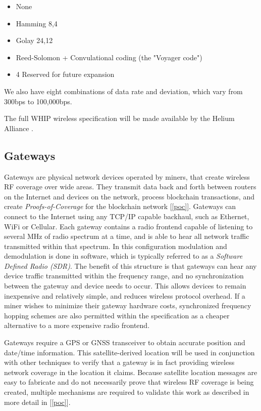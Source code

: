 \documentclass[letterpaper,11pt]{article}
\begin{document}
\begin{itemize}
	\item None
	\item Hamming 8,4
	\item Golay 24,12
	\item Reed-Solomon + Convulational coding (the "Voyager code")
	\item 4 Reserved for future expansion
\end{itemize}

We also have eight combinations of data rate and deviation, which vary from 300bps to 100,000bps.\newline

The full WHIP wireless specification will be made available by the Helium Alliance \cite{alliance}.

\subsection{Gateways} \label{gateways}

Gateways are physical network devices operated by miners, that create wireless RF coverage over wide areas. They transmit data back and forth between routers on the Internet and devices on the network, process blockchain transactions, and create \textit{Proofs-of-Coverage} for the blockchain network [\ref{poc}]. Gateways can connect to the Internet using any TCP/IP capable backhaul, such as Ethernet, WiFi or Cellular. Each gateway contains a radio frontend capable of listening to several MHz of radio spectrum at a time, and is able to hear all network traffic transmitted within that spectrum. In this configuration modulation and demodulation is done in software, which is typically referred to as a \textit{Software Defined Radio (SDR)}. The benefit of this structure is that gateways can hear any device traffic transmitted within the frequency range, and no synchronization between the gateway and device needs to occur. This allows devices to remain inexpensive and relatively simple, and reduces wireless protocol overhead. If a miner wishes to minimize their gateway hardware costs, synchronized frequency hopping schemes are also permitted within the specification as a cheaper alternative to a more expensive radio frontend.\newline

Gateways require a GPS or GNSS transceiver to obtain accurate position and date/time information. This satellite-derived location will be used in conjunction with other techniques to verify that a gateway is in fact providing wireless network coverage in the location it claims. Because satellite location messages are easy to fabricate and do not necessarily prove that wireless RF coverage is being created, multiple mechanisms are required to validate this work as described in more detail in [\ref{poc}].\newline
\end{document}
